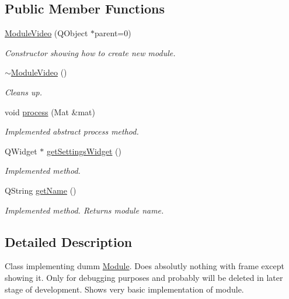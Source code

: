 \subsection*{Public Member Functions}
\begin{DoxyCompactItemize}
\item 
\hyperlink{class_module_video_a03331224ec3213a3b6264a318fe43e6c}{ModuleVideo} (QObject $\ast$parent=0)
\begin{DoxyCompactList}\small\item\em Constructor showing how to create new module. \item\end{DoxyCompactList}\item 
\hypertarget{class_module_video_abb569654e9c8df9bcadabf6a3eaff723}{
\hyperlink{class_module_video_abb569654e9c8df9bcadabf6a3eaff723}{$\sim$ModuleVideo} ()}
\label{db/d7c/class_module_video_abb569654e9c8df9bcadabf6a3eaff723}

\begin{DoxyCompactList}\small\item\em Cleans up. \item\end{DoxyCompactList}\item 
void \hyperlink{class_module_video_a57877a571a1d2aaf0c355e36f53341aa}{process} (Mat \&mat)
\begin{DoxyCompactList}\small\item\em Implemented abstract process method. \item\end{DoxyCompactList}\item 
QWidget $\ast$ \hyperlink{class_module_video_ae56c411ea37384d34702ddd994d9d02e}{getSettingsWidget} ()
\begin{DoxyCompactList}\small\item\em Implemented method. \item\end{DoxyCompactList}\item 
QString \hyperlink{class_module_video_a32ae57628cb1ebaf5c3447354bc86852}{getName} ()
\begin{DoxyCompactList}\small\item\em Implemented method. Returns module name. \item\end{DoxyCompactList}\end{DoxyCompactItemize}


\subsection{Detailed Description}
Class implementing dumm \hyperlink{class_module}{Module}. Does absolutly nothing with frame except showing it. Only for debugging purposes and probably will be deleted in later stage of development. Shows very basic implementation of module. 

